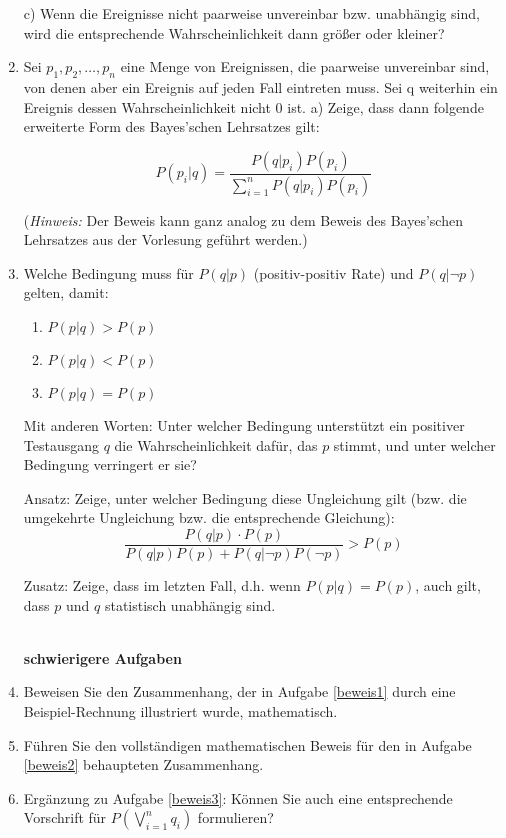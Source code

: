 \begin{enumerate}
c) Wenn die Ereignisse nicht paarweise unvereinbar bzw. unabhängig sind, wird
die entsprechende Wahrscheinlichkeit dann größer oder kleiner?

\item Sei $p_1, p_2, \ldots, p_n$ eine Menge von Ereignissen, die paarweise
unvereinbar sind, von denen aber ein Ereignis auf jeden Fall eintreten muss.
Sei q weiterhin ein Ereignis dessen Wahrscheinlichkeit nicht 0 ist. a) Zeige,
dass dann folgende erweiterte Form des Bayes'schen Lehrsatzes gilt:

\[ P(p_i|q) = \frac{P(q|p_i)P(p_i)}{\sum_{i=1}^{n}P(q|p_i)P(p_i)}
\]
 
({\em Hinweis:} Der Beweis kann ganz analog zu dem Beweis des Bayes'schen
Lehrsatzes aus der Vorlesung geführt werden.)

 
\item Welche Bedingung muss für $P(q|p)$ (positiv-positiv Rate) und $P(q|\neg
p)$ gelten, damit: \begin{enumerate}
                     \item $P(p|q) > P(p)$
                     \item $P(p|q) < P(p)$
                     \item $P(p|q) = P(p)$
\end{enumerate}
Mit anderen Worten: Unter welcher Bedingung unterstützt ein positiver
Testausgang $q$ die Wahrscheinlichkeit dafür, das $p$ stimmt, und unter welcher
Bedingung verringert er sie?

Ansatz: Zeige, unter welcher Bedingung diese Ungleichung gilt (bzw. die
umgekehrte Ungleichung bzw. die entsprechende Gleichung): 
\[ \frac{P(q|p)\cdot P(p)}{P(q|p)P(p) + P(q|\neg p)P(\neg p)} > P(p) \]

Zusatz: Zeige, dass im letzten Fall, d.h. wenn $P(p|q) = P(p)$, auch gilt, dass
$p$ und $q$ statistisch unabhängig sind. 


~\\{\bf schwierigere Aufgaben}\\

\item Beweisen Sie den Zusammenhang, der in
Aufgabe \ref{beweis1} durch eine Beispiel-Rechnung illustriert wurde,
mathematisch.

\item Führen Sie den vollständigen mathematischen Beweis für den in Aufgabe
\ref{beweis2} behaupteten Zusammenhang.

\item Ergänzung zu Aufgabe \ref{beweis3}: Können Sie auch eine entsprechende
Vor\-schrift für $P(\bigvee\limits_{i = 1}^{n} q_i)$ formulieren?
  
\end{enumerate}
